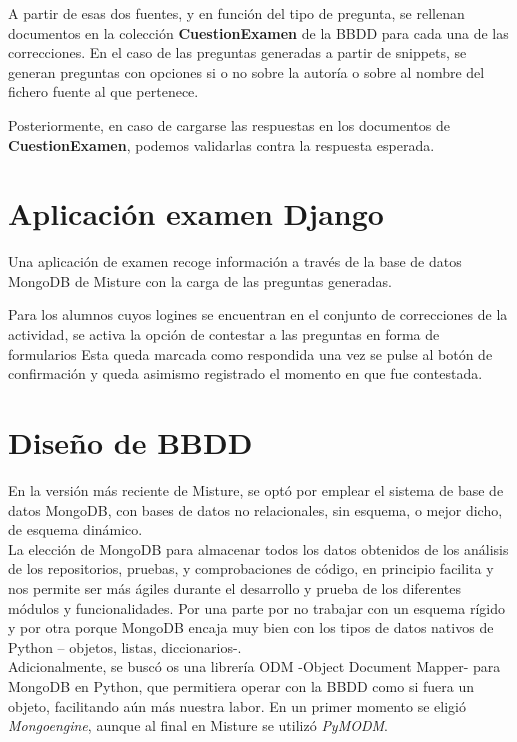 A partir de esas dos fuentes, y en función del tipo de pregunta, se rellenan documentos en la colección \textbf{CuestionExamen} de la BBDD para cada una de las correcciones. En el caso de las preguntas generadas a partir de snippets, se generan preguntas con opciones si o no sobre la autoría o sobre al nombre del fichero fuente al que pertenece.


Posteriormente, en caso de cargarse las respuestas en los documentos de \textbf{CuestionExamen}, podemos validarlas contra la respuesta esperada.


\section{Aplicación examen Django}

Una aplicación de examen recoge información a través de la base de datos MongoDB de Misture con la carga de las preguntas generadas.


Para los alumnos cuyos logines se encuentran en el conjunto de correcciones de la actividad, se activa la opción de contestar a las preguntas en forma de formularios Esta queda marcada como respondida una vez se pulse al botón de confirmación y queda asimismo registrado el momento en que fue contestada.


\section{Diseño de BBDD} 
\label{sec:bbdd}
En la versión más reciente de Misture, se optó por emplear el sistema de base de datos MongoDB, con bases de datos no relacionales, sin esquema, o mejor dicho, de esquema dinámico.\\


La elección de MongoDB para almacenar todos los datos obtenidos de los análisis de los repositorios, pruebas, y comprobaciones de código, en principio facilita y nos permite ser más ágiles durante el desarrollo y prueba de los diferentes módulos y funcionalidades. Por una parte por no trabajar con un esquema rígido y por otra porque MongoDB encaja muy bien con los tipos de datos nativos de Python – objetos, listas, diccionarios-.\\


Adicionalmente, se buscó os una librería ODM -Object Document Mapper- para MongoDB en Python, que permitiera operar con la BBDD como si fuera un objeto, facilitando aún más nuestra labor. En un primer momento se eligió \textit{Mongoengine}, aunque al final en Misture se utilizó \textit{PyMODM}.\\


